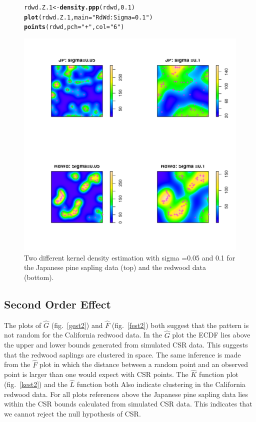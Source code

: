 \documentclass{article}\usepackage[]{graphicx}\usepackage[]{color}
\makeatletter
\def\maxwidth{ %
  \ifdim\Gin@nat@width>\linewidth
    \linewidth
  \else
    \Gin@nat@width
  \fi
}
\newcommand{\hlnum}[1]{\textcolor[rgb]{0.686,0.059,0.569}{#1}}%
\newcommand{\hlstr}[1]{\textcolor[rgb]{0.192,0.494,0.8}{#1}}%
\newcommand{\hlstd}[1]{\textcolor[rgb]{0.345,0.345,0.345}{#1}}%
\newcommand{\hlkwb}[1]{\textcolor[rgb]{0.69,0.353,0.396}{#1}}%
\newcommand{\hlkwc}[1]{\textcolor[rgb]{0.333,0.667,0.333}{#1}}%
\newcommand{\hlkwd}[1]{\textcolor[rgb]{0.737,0.353,0.396}{\textbf{#1}}}%
\newenvironment{kframe}{%
 \def\at@end@of@kframe{}%
 \ifinner\ifhmode%
  \def\at@end@of@kframe{\end{minipage}}%
  \begin{minipage}{\columnwidth}%
 \fi\fi%
 \def\FrameCommand##1{\hskip\@totalleftmargin \hskip-\fboxsep
 \colorbox{shadecolor}{##1}\hskip-\fboxsep
     \hskip-\linewidth \hskip-\@totalleftmargin \hskip\columnwidth}%
 \MakeFramed {\advance\hsize-\width
   \@totalleftmargin\z@ \linewidth\hsize
   \@setminipage}}%
 {\par\unskip\endMakeFramed%
 \at@end@of@kframe}
\newenvironment{knitrout}{}{} %
\makeatother
\begin{document}
\begin{figure}
\begin{knitrout}
\begin{kframe}
\begin{alltt}
\hlstd{rdwd.Z.1}\hlkwb{<-}\hlkwd{density.ppp}\hlstd{(rdwd,} \hlnum{0.1}\hlstd{)}
\hlkwd{plot}\hlstd{(rdwd.Z.1,} \hlkwc{main}\hlstd{=}\hlstr{"RdWd: Sigma =0.1"}\hlstd{)}
\hlkwd{points}\hlstd{(rdwd,} \hlkwc{pch}\hlstd{=}\hlstr{"+"}\hlstd{,} \hlkwc{col}\hlstd{=}\hlstr{"6"}\hlstd{)}
\end{alltt}
\end{kframe}
\includegraphics[width=\maxwidth]{figure/kernelest05} 

\end{knitrout}
\caption{Two different kernel density estimation with sigma =0.05 and 0.1 for the Japanese pine sapling data (top) and the redwood data (bottom).}
\label{kern}
\end{figure}
\FloatBarrier

\subsection{Second Order Effect}
The plots of $\hat{G}$ (fig.~\ref{gest2}) and $\hat{F}$ (fig.~\ref{fest2}) both suggest that the pattern is not random for the California redwood data.  In the $\hat{G}$ plot the ECDF lies above the upper and lower bounds generated from simulated CSR data.  This suggests that the redwood saplings are clustered in space. The same inference is made from the $\hat{F}$ plot in which the distance between a random point and an observed point is larger than one would expect with CSR points.  The $\hat{K}$ function plot (fig.~\ref{kest2}) and the $\hat{L}$ function both  Also indicate clustering in the California redwood data.  For all plots references above the Japanese pine sapling data lies within the CSR bounds calculated from simulated CSR data.  This indicates that we cannot reject the null hypothesis of CSR.\\
\end{document}
